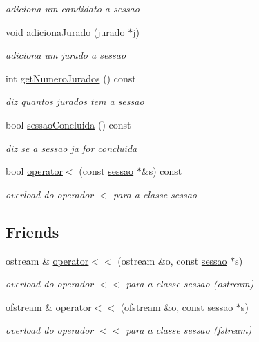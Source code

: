 \begin{DoxyCompactItemize}
\begin{DoxyCompactList}\small\item\em adiciona um candidato a sessao \end{DoxyCompactList}\item 
void \hyperlink{classsessao_a0eee24076fd8c1e474e1868abb9d166d}{adiciona\+Jurado} (\hyperlink{classjurado}{jurado} $\ast$j)
\begin{DoxyCompactList}\small\item\em adiciona um jurado a sessao \end{DoxyCompactList}\item 
int \hyperlink{classsessao_a247360575defbe2733ed6293a6d90a0d}{get\+Numero\+Jurados} () const 
\begin{DoxyCompactList}\small\item\em diz quantos jurados tem a sessao \end{DoxyCompactList}\item 
bool \hyperlink{classsessao_ab9e1e5203a930bcbf8ec4233972e6676}{sessao\+Concluida} () const 
\begin{DoxyCompactList}\small\item\em diz se a sessao ja for concluida \end{DoxyCompactList}\item 
bool \hyperlink{classsessao_ac7da1ba482dc3a5b65f4ad3915a2420e}{operator$<$} (const \hyperlink{classsessao}{sessao} $\ast$\&s) const 
\begin{DoxyCompactList}\small\item\em overload do operador $<$ para a classe sessao \end{DoxyCompactList}\end{DoxyCompactItemize}
\subsection*{Friends}
\begin{DoxyCompactItemize}
\item 
ostream \& \hyperlink{classsessao_a442be9403858cf93de76510cccc64496}{operator$<$$<$} (ostream \&o, const \hyperlink{classsessao}{sessao} $\ast$s)
\begin{DoxyCompactList}\small\item\em overload do operador $<$$<$ para a classe sessao (ostream) \end{DoxyCompactList}\item 
ofstream \& \hyperlink{classsessao_ac46d6bce5998eb1597ae5866c39938c5}{operator$<$$<$} (ofstream \&o, const \hyperlink{classsessao}{sessao} $\ast$s)
\begin{DoxyCompactList}\small\item\em overload do operador $<$$<$ para a classe sessao (fstream) \end{DoxyCompactList}\end{DoxyCompactItemize}


